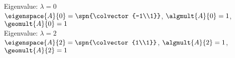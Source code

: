 Eigenvalue: $\lambda = 0$\\
$\eigenspace{A}{0} = \spn{\colvector{-1\\1}}$, $\algmult{A}{0} = 1$, $\geomult{A}{0} = 1$\\
Eigenvalue: $\lambda = 2$\\
$\eigenspace{A}{2} = \spn{\colvector{1\\1}}$, $\algmult{A}{2} = 1$, $ \geomult{A}{2} = 1$

